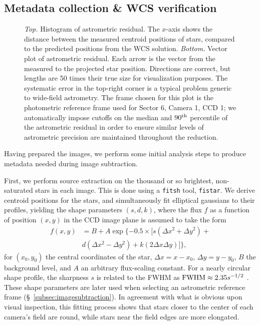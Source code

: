 \documentclass[12pt,twocolumn,tighten]{aastex62}
\begin{document}
\subsection{Metadata collection \& WCS verification}
\label{subsec:metadatacollection}

\begin{figure}[!t]
	\vspace{-0.8cm}
	\vspace{-0.8cm}
    \caption{
		{\it Top.} Histogram of astrometric residual. The $x$-axis shows 
		the distance between the measured centroid positions of stars, 
		compared to the predicted positions from the WCS solution.
		{\it Bottom.} Vector plot of astrometric residual. Each arrow is 
		the vector from the measured to the projected star position. 
		Directions are correct, but lengths are 50 times their true size for 
		visualization purposes.
    The systematic error in the top-right corner is a typical
    problem generic to wide-field astrometry.
    The frame chosen for this plot is the photometric reference frame used 
    for Sector 6, Camera 1, CCD 1; we automatically 
    impose cutoffs on the median and $90^{\rm th}$ percentile of the 
    astrometric residual in order to ensure similar levels of astrometric 
    precision are maintained throughout the reduction.
	}
	\label{fig:astromresid}
\end{figure}

Having prepared the images, we perform some initial analysis steps to
produce metadata needed during image subtraction.  

First, we perform source extraction on the
thousand or so brightest, non-saturated stars in each image.  
This is done using a \texttt{fitsh} tool, \texttt{fistar}.
We derive centroid positions for the stars, and
simultaneously
fit elliptical gaussians to their profiles, yielding the shape
parameters $(s,d,k)$, where the flux $f$ as a function of position
$(x,y)$ in the CCD image plane is assumed to take the form
\begin{align}
  f(x,y) &= B + A \exp \{ -0.5 \times [
    s(\Delta x^2 + \Delta y^2) + \\
    \nonumber
    &d(\Delta x^2 - \Delta y^2) +
    k(2\Delta x \Delta y)
  ]  \},
\end{align}
for $(x_0,y_0)$ the central coordinates of the star,
$\Delta x = x-x_0$, $\Delta y = y - y_0$, $B$ the background
level, and $A$ an arbitrary
flux-scaling constant.
For a nearly circular shape profile, the sharpness $s$ is related to
the FWHM as ${\rm FWHM} \approx 2.35s^{-1/2}$ \citep[{\it
e.g.},][]{Pal_2009}.  These shape parameters are later used when
selecting an astrometric reference frame
(\S~\ref{subsec:imagesubtraction}).  
In agreement with what is obvious upon visual inspection, this 
fitting process shows that stars closer to the
center of each camera's field are round, while
stars near the field edges are more elongated.
\end{document}
